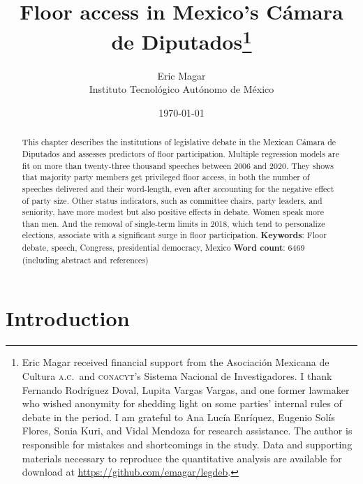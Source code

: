 \documentclass[letter,12pt]{article}
\begin{document}
\title{Floor access in Mexico's Cámara de Diputados\thanks{Eric Magar received financial support from the Asociaci\'on Mexicana de Cultura \textsc{a.c.}\ and \textsc{conacyt}'s Sistema Nacional de Investigadores. I thank Fernando Rodríguez Doval, Lupita Vargas Vargas, and one former lawmaker who wished anonymity for shedding light on some parties' internal rules of debate in the period. I am grateful to Ana Lucía Enríquez, Eugenio Solís Flores, Sonia Kuri, and Vidal Mendoza for research assistance. The author is responsible for mistakes and shortcomings in the study. Data and supporting materials necessary to reproduce the quantitative analysis are available for download at \url{https://github.com/emagar/legdeb}.}}
\author{Eric Magar \\ Instituto Tecnológico Autónomo de México}
\date{\today}
\maketitle


\begin{abstract}
\noindent This chapter describes the institutions of legislative debate in the Mexican Cámara de Diputados and assesses predictors of floor participation. Multiple regression models are fit on more than twenty-three thousand speeches between 2006 and 2020. They shows that majority party members get privileged floor access, in both the number of speeches delivered and their word-length, even after accounting for the negative effect of party size. Other status indicators, such as committee chairs, party leaders, and seniority, have more modest but also positive effects in debate. Women speak more than men. And the removal of single-term limits in 2018, which tend to personalize elections, associate with a significant surge in floor participation. 
\newline
\newline
\textbf{Keywords}: Floor debate, speech, Congress, presidential democracy, Mexico
\newline
\newline
\textbf{Word count}: 6469 (including abstract and references)
\end{abstract}

\newpage

\doublespacing

\section{Introduction} %
\end{document}

